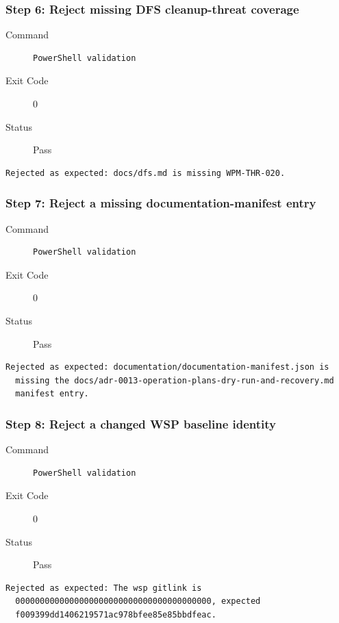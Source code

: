 \subsubsection*{Step 6: Reject missing DFS cleanup-threat coverage}
\begin{description}
\item[Command] \mbox{}
\begin{verbatim}
PowerShell validation
\end{verbatim}
\item[Exit Code] 0
\item[Status] Pass
\end{description}
\begin{verbatim}
Rejected as expected: docs/dfs.md is missing WPM-THR-020.
\end{verbatim}
\subsubsection*{Step 7: Reject a missing documentation-manifest entry}
\begin{description}
\item[Command] \mbox{}
\begin{verbatim}
PowerShell validation
\end{verbatim}
\item[Exit Code] 0
\item[Status] Pass
\end{description}
\begin{verbatim}
Rejected as expected: documentation/documentation-manifest.json is
  missing the docs/adr-0013-operation-plans-dry-run-and-recovery.md
  manifest entry.
\end{verbatim}
\subsubsection*{Step 8: Reject a changed WSP baseline identity}
\begin{description}
\item[Command] \mbox{}
\begin{verbatim}
PowerShell validation
\end{verbatim}
\item[Exit Code] 0
\item[Status] Pass
\end{description}
\begin{verbatim}
Rejected as expected: The wsp gitlink is
  0000000000000000000000000000000000000000, expected
  f009399dd1406219571ac978bfee85e85bbdfeac.
\end{verbatim}
